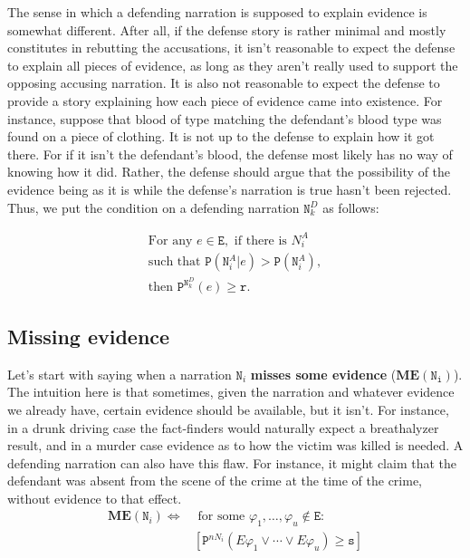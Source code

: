 \documentclass[10pt,leqno]{article}
\begin{document}
The sense in which a defending narration is supposed to explain evidence is somewhat different. After all, if the defense story is rather minimal and mostly constitutes in rebutting the accusations, it isn't reasonable to expect the defense to explain all pieces of evidence, as long as they aren't really used to support the opposing accusing narration. It is also not reasonable to expect the defense to provide a story explaining how each piece of evidence came into existence. For instance, suppose that blood of type matching the defendant's  blood type was found on a piece of clothing. It is not up to the defense to explain how it got there. For if it isn't the defendant's blood, the defense most likely has no way of knowing how it did. Rather, the defense should argue that the possibility of the evidence being as it is while the defense's narration is true hasn't been rejected. Thus, we put the condition on a defending narration $\mathtt{N}^D_k$ as follows:

\begin{align*}
\tag{Explaining evidence D}\label{Explaining evidence D} 
\mbox{For any } e\in \mathtt{E}, \mbox{ if there is } N^A_i \\
\nonumber
\mbox{such that } \mathtt{P}(\mathtt{N}^A_i\vert e)> \mathtt{P}(\mathtt{N}^A_i),
\\
\nonumber
\mbox{then } \mathtt{P}^{\mathtt{N}^D_k}(e)\geq \mathtt{r}.
\end{align*}











\subsection{Missing evidence}

Let's start with saying when a narration
  $\mathtt{N}_i$ \textbf{misses some evidence} ($\mathbf{ME}(\mathtt{N_i})$). The intuition here is that sometimes, given the  narration and whatever evidence we already have, certain evidence should be available, but it isn't. For instance, in a drunk driving case  the fact-finders would naturally expect a breathalyzer result, and in a murder case evidence as to how the victim was killed is needed. A  defending narration can also have this flaw. For instance, it might claim that the defendant was absent from the scene of the crime at the time of the crime, without evidence to that effect.
    \begin{align}
  \tag{Missing evidence}
  \label{Missing evidence}
\mathbf{ME}(\mathtt{N}_i)  \Leftrightarrow & \mbox{ for some } \varphi_1, \dots, \varphi_u  \not \in \mathtt{E}: \\ \nonumber
&  [\mathtt{P}^{nN_i}(E\varphi_1\vee \cdots \vee E \varphi_u) \geq \mathtt{s}  ]  \end{align}
\end{document}
